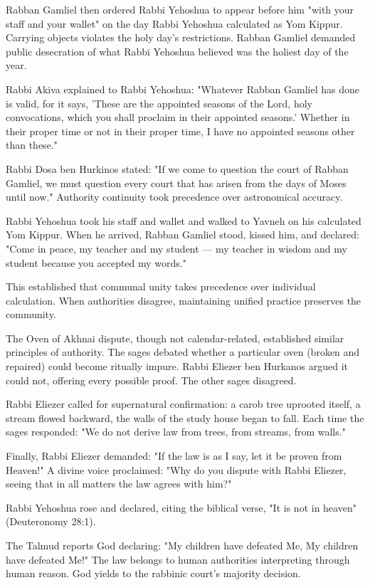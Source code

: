 Rabban Gamliel then ordered Rabbi Yehoshua to appear before him "with your staff and your wallet" on the day Rabbi Yehoshua calculated as Yom Kippur. Carrying objects violates the holy day's restrictions. Rabban Gamliel demanded public desecration of what Rabbi Yehoshua believed was the holiest day of the year.

Rabbi Akiva explained to Rabbi Yehoshua: "Whatever Rabban Gamliel has done is valid, for it says, 'These are the appointed seasons of the Lord, holy convocations, which you shall proclaim in their appointed seasons.' Whether in their proper time or not in their proper time, I have no appointed seasons other than these."

Rabbi Dosa ben Hurkinos stated: "If we come to question the court of Rabban Gamliel, we must question every court that has arisen from the days of Moses until now." Authority continuity took precedence over astronomical accuracy.

Rabbi Yehoshua took his staff and wallet and walked to Yavneh on his calculated Yom Kippur. When he arrived, Rabban Gamliel stood, kissed him, and declared: "Come in peace, my teacher and my student — my teacher in wisdom and my student because you accepted my words."

This established that communal unity takes precedence over individual calculation. When authorities disagree, maintaining unified practice preserves the community.

The Oven of Akhnai dispute, though not calendar-related, established similar principles of authority. The sages debated whether a particular oven (broken and repaired) could become ritually impure. Rabbi Eliezer ben Hurkanos argued it could not, offering every possible proof. The other sages disagreed.

Rabbi Eliezer called for supernatural confirmation: a carob tree uprooted itself, a stream flowed backward, the walls of the study house began to fall. Each time the sages responded: "We do not derive law from trees, from streams, from walls."

Finally, Rabbi Eliezer demanded: "If the law is as I say, let it be proven from Heaven!" A divine voice proclaimed: "Why do you dispute with Rabbi Eliezer, seeing that in all matters the law agrees with him?"

Rabbi Yehoshua rose and declared, citing the biblical verse, "It is not in heaven" (Deuteronomy 28:1).

The Talmud reports God declaring: "My children have defeated Me, My children have defeated Me!" The law belongs to human authorities interpreting through human reason. God yields to the rabbinic court's majority decision.

